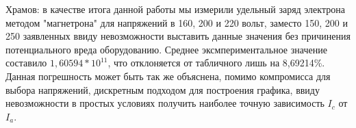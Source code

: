 Храмов: в качестве итога данной работы мы измерили удельный заряд электрона методом "магнетрона" для напряжений в 160, 200 и 220 вольт, заместо 150, 200 и 250 заявленных ввиду невозможности выставить данные значения без причинения потенциального вреда оборудованию. Среднее эксмпериментальное значение составило $1,60594 * 10^11$, что отклоняется от табличного лишь на 8,69214\%. Данная погрешность может быть так же объяснена, помимо компромисса для выбора напряжений, дискретным подходом для построения графика, ввиду невозможности в простых условиях получить наиболее точную зависимость $I_c$ от $I_a$.


